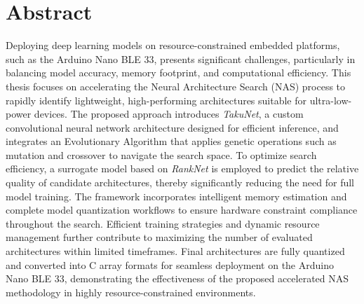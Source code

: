 \section*{Abstract}
Deploying deep learning models on resource-constrained embedded platforms, such as the Arduino Nano BLE 33, presents significant challenges, particularly in balancing model accuracy, memory footprint, and computational efficiency. This thesis focuses on accelerating the Neural Architecture Search (NAS) process to rapidly identify lightweight, high-performing architectures suitable for ultra-low-power devices. The proposed approach introduces \textit{TakuNet}, a custom convolutional neural network architecture designed for efficient inference, and integrates an Evolutionary Algorithm that applies genetic operations such as mutation and crossover to navigate the search space. To optimize search efficiency, a surrogate model based on \textit{RankNet} is employed to predict the relative quality of candidate architectures, thereby significantly reducing the need for full model training. The framework incorporates intelligent memory estimation and complete model quantization workflows to ensure hardware constraint compliance throughout the search. Efficient training strategies and dynamic resource management further contribute to maximizing the number of evaluated architectures within limited timeframes. Final architectures are fully quantized and converted into C array formats for seamless deployment on the Arduino Nano BLE 33, demonstrating the effectiveness of the proposed accelerated NAS methodology in highly resource-constrained environments.





